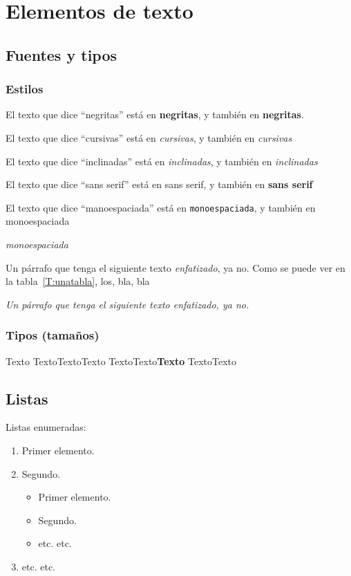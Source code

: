 \chapter{Elementos de texto}
\section{Fuentes y tipos}

\subsection*{Estilos}

 El texto que dice \enquote{negritas} está en \textbf{negritas}, y también en {\bfseries negritas}.
 
 El texto que dice \enquote{cursivas} está en \textit{cursivas}, y también en {\itshape cursivas}
 
 El texto que dice \enquote{inclinadas} está en \textsl{inclinadas}, y también en {\slshape inclinadas}

 El texto que dice \enquote{sans serif} está en \textsf{sans serif}, y también en {\sffamily \textbf{sans serif}}

 El texto que dice \enquote{manoespaciada} está en \texttt{monoespaciada}, y también en {\ttfamily monoespaciada}

 {\ttfamily \textit{monoespaciada}}

Un párrafo que tenga el siguiente texto \emph{enfatizado}, ya no. Como se puede ver en la tabla~\ref{T:unatabla}, los, bla, bla

\textit{Un párrafo que tenga el siguiente texto \emph{enfatizado}, ya no.
}

\subsection{Tipos (tamaños)}

{\tiny Texto}
{\footnotesize Texto}{\small Texto}{\normalsize Texto}
{\large Texto}{\Large Texto}{\LARGE\bfseries\sffamily Texto}
{\huge Texto}{\Huge Texto}


\section{Listas}

Listas enumeradas:
\begin{enumerate}
  \item Primer elemento.
  \item Segundo.
  \begin{itemize}
    \item Primer elemento.
    \item Segundo.
    \item etc. etc.
  \end{itemize}  
  \item etc. etc.
\end{enumerate}


\endinput
